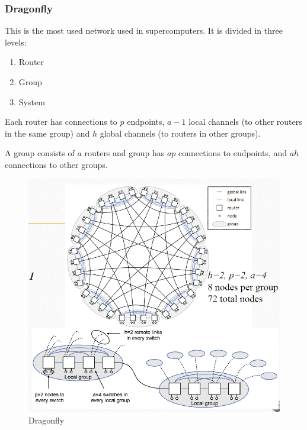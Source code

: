 \subsubsection{Dragonfly}

\begin{paracol}{2}
   
   This is the most used network used in supercomputers. It is divided in three levels:
   \begin{enumerate}
      \item Router
      \item Group
      \item System
   \end{enumerate}
   
   Each router has connections to $p$ endpoints, $a-1$ local channels (to other routers in the same group) and $h$ global channels (to routers in other groups).
   
   A group consists of $a$ routers and group has $ap$ connections to endpoints, and $ah$ connections to other groups.
   
   \switchcolumn
   \begin{figure}[htbp]
      \centering
      \includegraphics{images/05/dragonfly.png}
      \caption{Dragonfly}
      \label{fig:05/dragonfly}
   \end{figure}
\end{paracol}


